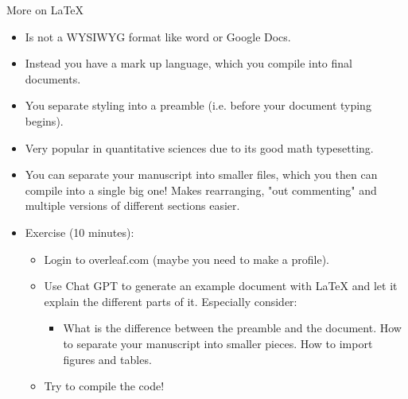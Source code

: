 \documentclass{beamer}
\begin{document}
\begin{frame}{More on LaTeX}

\begin{itemize}
    \item Is not a WYSIWYG format like word or Google Docs.
    \item Instead you have a mark up language, which you compile into final documents.
    \item You separate styling into a preamble (i.e. before your document typing begins).
    \item Very popular in quantitative sciences due to its good math typesetting.
    \item You can separate your manuscript into smaller files, which you then can compile into a single big one! Makes rearranging, "out commenting" and multiple versions of different sections easier.
    \item Exercise (10 minutes):
        \begin{itemize}
            \item Login to overleaf.com (maybe you need to make a profile).
            \item Use Chat GPT to generate an example document with LaTeX and let it explain the different parts of it. Especially consider:
            \begin{itemize}
                \item What is the difference between the preamble and the document. How to separate your manuscript into smaller pieces. How to import figures and tables.
            \end{itemize}
            \item Try to compile the code!
        \end{itemize}
\end{itemize}
\end{frame}
\end{document}

